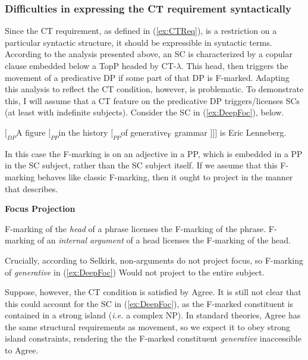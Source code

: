 \documentclass[
	letterpaper,
]{article}
\begin{document}
\subsubsection{Difficulties in expressing the CT requirement syntactically}
Since the CT requirement, as defined in (\ref{ex:CTReq}), is a restriction on a particular syntactic structure, it should be expressible in syntactic terms.
According to the analysis presented above, an SC is characterized by a copular clause embedded below a TopP headed by CT-$\lambda$.
This head, then triggers the movement of a predicative DP if some part of that DP is F-marked.
Adapting this analysis to reflect the CT condition, however, is problematic.
To demonstrate this, I will assume that a CT feature on the predicative DP triggers/licenses SCs (at least with indefinite subjects).
Consider the SC in (\ref{ex:DeepFoc}), below.
\begin{exe}
	\ex\label{ex:DeepFoc} $[_{DP}$A figure $[_{PP}$in the history $[_{PP}$of generative$_\text{F}$ grammar $]]]$ is Eric Lenneberg.
\end{exe}

In this case the F-marking is on an adjective in a PP, which is embedded in a PP in the SC subject, rather than the SC subject itself.
If we assume that this F-marking behaves like classic F-marking, then it ought to project in the manner that \textcite{selkirk1996sentence} describes.
\begin{exe}
	\ex \textbf{Focus Projection} \parencite{selkirk1996sentence}
	\begin{xlist}
		\ex F-marking of the \textit{head} of a phrase licenses the F-marking of the phrase.
		\ex F-marking of an \textit{internal argument} of a head licenses the F-marking of the head.		
	\end{xlist}	
\end{exe}

Crucially, according to Selkirk, non-arguments do not project focus, so F-marking of \textit{generative} in (\ref{ex:DeepFoc}) Would not project to the entire subject.

Suppose, however, the CT condition is satisfied by Agree.
It is still not clear that this could account for the SC in (\ref{ex:DeepFoc}), as the F-marked constituent is contained in a strong island (\textit{i.e.} a complex NP).
In standard theories, Agree has the same structural requirements as movement, so we expect it to obey strong island constraints, rendering the the F-marked constituent \textit{generative} inaccessible to Agree.
\end{document}
